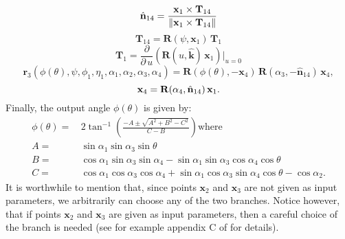 \documentclass[11pt]{article}
\providecommand{\norm}[1]{\lVert #1\rVert }
\begin{document}
\begin{equation}\label{n14}
\hat{\bf{n}}_{14} = \frac{\mathbf{x}_1\times \mathbf{T}_{14}}{\norm{
\mathbf{x}_1\times \mathbf{T}_{14}}}
\end{equation}
\begin{equation}
\mathbf{T}_{14} = \mathbf{R}(\psi,\mathbf{x}_1)\,\mathbf{T}_1
\end{equation}
\begin{equation}
\mathbf{T}_1 = \frac{\partial  }{\partial \, u}\left(\mathbf{R}(u,
\hat{\mathbf{k}})\,\mathbf{x}_1\right)\bigg|_{u=0}
\end{equation}
\begin{equation}\label{r3}
 {\mathbf r}_3(\phi(\theta),\psi,\phi_1,\eta_1,\alpha_1,\alpha_2,
 \alpha_3,\alpha_4)={\mathbf R}(\phi(\theta),-{\mathbf x}_4)\,\mathbf{R}
 (\alpha_3,-\hat{\mathbf{n}}_{14})\,\mathbf {x}_4,
\end{equation} 
\begin{equation}
\mathbf{x}_4 = \mathbf{R}(\alpha_4,\hat{\bf{n}}_{14})\,\mathbf{x}_1.
\end{equation}
Finally, the output angle $\phi(\theta)$ is given by:
\begin{align}\label{phiangleB}
\phi(\theta)=\, &2 \tan^{-1}\left(\frac{-A\pm \sqrt{A^2+B^2-C^2}}{C-B}
\right)\text{where}\\
A=\,&\sin \alpha _1 \sin \alpha _3 \sin \theta \nonumber\\
B=\,&\cos \alpha _1 \sin \alpha _3 \sin \alpha _4 -
\sin \text{$\alpha _1$} \sin \text{$\alpha _3$} \cos
\text{$\alpha _4$} \cos \theta \nonumber\\
C=\,&\cos \text{$\alpha _1$} \cos \text{$\alpha _3$}
\cos \text{$\alpha _4$} + \sin \text{$\alpha _1$} \cos 
\text{$\alpha _3 $} \sin \text{$\alpha _4$} \cos \theta -\cos 
\text{$\alpha _2 $}\nonumber.
\end{align}
It is worthwhile to mention that, since points 
$\mathbf{x}_2$ and $\mathbf{x}_3$ are not given as input parameters, we 
arbitrarily can choose any of the two branches. Notice however, that if 
points $\mathbf{x}_2$ and $\mathbf{x}_3$ are given as input parameters, 
then a careful choice of the branch is needed (see for example appendix 
C of \cite{Cervantes2009} for details).
\end{document}
